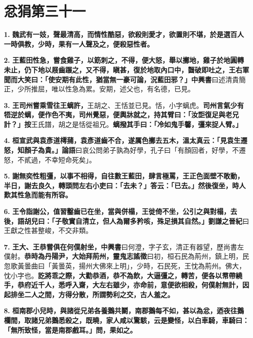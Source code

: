 \chapter{忿狷第三十一}

\textbf{1.} \textbf{魏武有一妓，聲最清高，而情性酷惡，欲殺則愛才，欲置則不堪，於是選百人一時俱教，少時，果有一人聲及之，便殺惡性者。}

\textbf{2.} \textbf{王藍田性急，嘗食雞子，以筯刺之，不得，便大怒，舉以擲地，雞子於地圓轉未止，仍下地以屐齒蹍之，又不得，瞋甚，復於地取內口中，齧破即吐之，王右軍聞而大笑曰：「使安期有此性，猶當無一豪可論，況藍田邪？」}{\footnotesize \textbf{中興書}曰述清貴簡正，少所推屈，唯以性急為累。安期，述父也，有名德，已見。}

\textbf{3.} \textbf{王司州嘗乘雪往王螭許，}{\footnotesize 王胡之、王恬並已見。恬，小字螭虎。}\textbf{司州言氣少有牾逆於螭，便作色不夷，司州覺惡，便輿牀就之，持其臂曰：「汝詎復足與老兄計？」}{\footnotesize \textbf{按}王氏譜，胡之是恬從祖兄。}\textbf{螭撥其手曰：「冷如鬼手馨，彊來捉人臂。」}

\textbf{4.} \textbf{桓宣武與袁彥道樗蒱，袁彥道齒不合，遂厲色擲去五木，溫太真云：「見袁生遷怒，知顏子為貴。」}{\footnotesize \textbf{論語}曰哀公問弟子孰為好學，孔子曰「有顏回者，好學，不遷怒，不貳過，不幸短命死矣」。}

\textbf{5.} \textbf{謝無奕性粗彊，以事不相得，自往數王藍田，肆言極罵，王正色面壁不敢動，半日，謝去良久，轉頭問左右小吏曰：「去未？」答云：「已去。」然後復坐，時人歎其性急而能有所容。}

\textbf{6.} \textbf{王令詣謝公，值習鑿齒已在坐，當與併榻，王徙倚不坐，公引之與對榻，去後，語胡兒曰：「子敬實自清立，但人為爾多矜咳，殊足損其自然。」}{\footnotesize \textbf{劉謙之晉紀}曰王獻之性甚整峻，不交非類。}

\textbf{7.} \textbf{王大、王恭嘗俱在何僕射坐，}{\footnotesize \textbf{中興書}曰何澄，字子玄，清正有器望，歷尚書左僕射。}\textbf{恭時為丹陽尹，大始拜荊州，}{\footnotesize \textbf{靈鬼志謠徵}曰初，桓石民為荊州，鎮上明，民忽歌黃曇曲曰「黃曇英，揚州大佛來上明」，少時，石民死，王忱為荊州。佛大，忱小字也。}\textbf{訖將乖之際，大勸恭酒，恭不為飲，大逼彊之，轉苦，便各以帬帶繞手，恭府近千人，悉呼入齋，大左右雖少，亦命前，意便欲相殺，何僕射無計，因起排坐二人之間，方得分散，所謂勢利之交，古人羞之。}

\textbf{8.} \textbf{桓南郡小兒時，與諸從兄弟各養鵝共鬬，南郡鵝每不如，甚以為忿，迺夜往鵝欄間，取諸兄弟鵝悉殺之，既曉，家人咸以驚駭，云是變怪，以白車騎，車騎曰：「無所致怪，當是南郡戲耳。」問，果如之。}